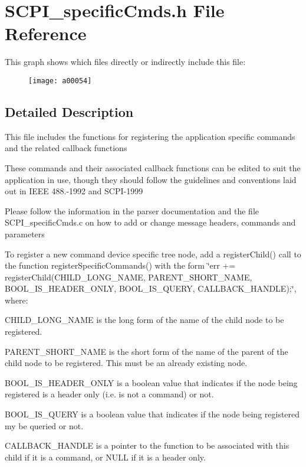 \hypertarget{a00030}{\section{S\-C\-P\-I\-\_\-specific\-Cmds.\-h File Reference}
\label{a00030}
}
This graph shows which files directly or indirectly include this file\-:
\nopagebreak
\begin{figure}[H]
\begin{center}
\leavevmode
\texttt{[image: a00054]}
\end{center}
\end{figure}


\subsection{Detailed Description}
This file includes the functions for registering the application specific commands and the related callback functions

These commands and their associated callback functions can be edited to suit the application in use, though they should follow the guidelines and conventions laid out in I\-E\-E\-E 488.-\/1992 and S\-C\-P\-I-\/1999

Please follow the information in the parser documentation and the file S\-C\-P\-I\-\_\-specific\-Cmds.\-c on how to add or change message headers, commands and parameters

To register a new command device specific tree node, add a register\-Child() call to the function register\-Specific\-Commands() with the form \char`\"{}err += register\-Child(\-C\-H\-I\-L\-D\-\_\-\-L\-O\-N\-G\-\_\-\-N\-A\-M\-E, P\-A\-R\-E\-N\-T\-\_\-\-S\-H\-O\-R\-T\-\_\-\-N\-A\-M\-E,
\-B\-O\-O\-L\-\_\-\-I\-S\-\_\-\-H\-E\-A\-D\-E\-R\-\_\-\-O\-N\-L\-Y, B\-O\-O\-L\-\_\-\-I\-S\-\_\-\-Q\-U\-E\-R\-Y, C\-A\-L\-L\-B\-A\-C\-K\-\_\-\-H\-A\-N\-D\-L\-E);\char`\"{}, where\-:
\begin{DoxyItemize}
\item C\-H\-I\-L\-D\-\_\-\-L\-O\-N\-G\-\_\-\-N\-A\-M\-E is the long form of the name of the child node to be registered.
\item P\-A\-R\-E\-N\-T\-\_\-\-S\-H\-O\-R\-T\-\_\-\-N\-A\-M\-E is the short form of the name of the parent of the child node to be registered. This must be an already existing node.
\item B\-O\-O\-L\-\_\-\-I\-S\-\_\-\-H\-E\-A\-D\-E\-R\-\_\-\-O\-N\-L\-Y is a boolean value that indicates if the node being registered is a header only (i.\-e. is not a command) or not.
\item B\-O\-O\-L\-\_\-\-I\-S\-\_\-\-Q\-U\-E\-R\-Y is a boolean value that indicates if the node being registered my be queried or not.
\item C\-A\-L\-L\-B\-A\-C\-K\-\_\-\-H\-A\-N\-D\-L\-E is a pointer to the function to be associated with this child if it is a command, or N\-U\-L\-L if it is a header only.
\end{DoxyItemize}

